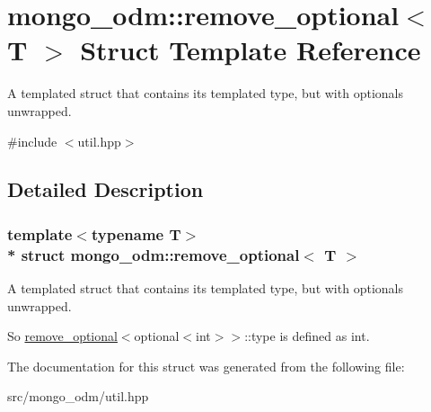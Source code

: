 \hypertarget{structmongo__odm_1_1remove__optional}{}\section{mongo\+\_\+odm\+:\+:remove\+\_\+optional$<$ T $>$ Struct Template Reference}
\label{structmongo__odm_1_1remove__optional}


A templated struct that contains its templated type, but with optionals unwrapped.  




{\ttfamily \#include $<$util.\+hpp$>$}



\subsection{Detailed Description}
\subsubsection*{template$<$typename T$>$\\*
struct mongo\+\_\+odm\+::remove\+\_\+optional$<$ T $>$}

A templated struct that contains its templated type, but with optionals unwrapped. 

So {\ttfamily \hyperlink{structmongo__odm_1_1remove__optional}{remove\+\_\+optional}$<$optional$<$int$>$$>$\+::type} is defined as {\ttfamily int}. 

The documentation for this struct was generated from the following file\+:\begin{DoxyCompactItemize}
\item 
src/mongo\+\_\+odm/util.\+hpp\end{DoxyCompactItemize}
